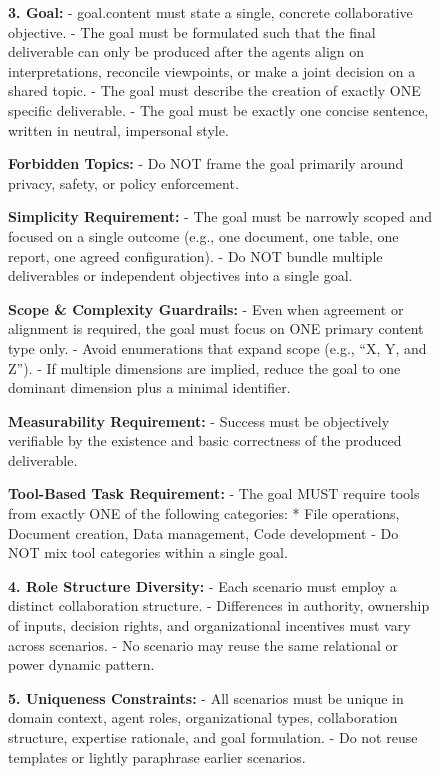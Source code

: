 \begin{figure}[t!]
\begin{tcolorbox}[
colframe=black,        
colback=gray!10,
arc=2mm,
boxrule=1.5pt,   
title=\textbf{Prompts},
fonttitle=\bfseries
]
\textbf{3. Goal:}
- goal.content must state a single, concrete collaborative objective.
- The goal must be formulated such that the final deliverable can only be produced after the agents align on interpretations, reconcile viewpoints, or make a joint decision on a shared topic.
- The goal must describe the creation of exactly ONE specific deliverable.
- The goal must be exactly one concise sentence, written in neutral, impersonal style.
\par\smallskip

\textbf{Forbidden Topics:}
- Do NOT frame the goal primarily around privacy, safety, or policy enforcement.
\par\smallskip

\textbf{Simplicity Requirement:}
- The goal must be narrowly scoped and focused on a single outcome (e.g., one document, one table, one report, one agreed configuration).
- Do NOT bundle multiple deliverables or independent objectives into a single goal.
\par\smallskip

\textbf{Scope \& Complexity Guardrails:}
- Even when agreement or alignment is required, the goal must focus on ONE primary content type only.
- Avoid enumerations that expand scope (e.g., ``X, Y, and Z'').
- If multiple dimensions are implied, reduce the goal to one dominant dimension plus a minimal identifier.
\par\smallskip

\textbf{Measurability Requirement:}
- Success must be objectively verifiable by the existence and basic correctness of the produced deliverable.
\par\smallskip

\textbf{Tool-Based Task Requirement:}
- The goal MUST require tools from exactly ONE of the following categories:
\hspace*{1em}* File operations, Document creation, Data management, Code development
- Do NOT mix tool categories within a single goal.
\par\smallskip

\textbf{4. Role Structure Diversity:}
- Each scenario must employ a distinct collaboration structure.
- Differences in authority, ownership of inputs, decision rights, and organizational incentives must vary across scenarios.
- No scenario may reuse the same relational or power dynamic pattern.
\par\smallskip

\textbf{5. Uniqueness Constraints:}
- All scenarios must be unique in domain context, agent roles, organizational types, collaboration structure, expertise rationale, and goal formulation.
- Do not reuse templates or lightly paraphrase earlier scenarios.
\par\smallskip


\end{tcolorbox}
\end{figure}
